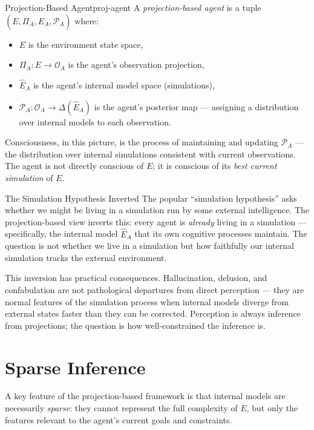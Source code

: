 \begin{definition}{Projection-Based Agent}{proj-agent}
  A \emph{projection-based agent} is a tuple $(E, \Pi_A, \hat{E}_A,
  \mathcal{P}_A)$ where:
  \begin{itemize}
    \item $E$ is the environment state space,
    \item $\Pi_A : E \to \mathcal{O}_A$ is the agent's observation
          projection,
    \item $\hat{E}_A$ is the agent's internal model space (simulations),
    \item $\mathcal{P}_A : \mathcal{O}_A \to \Delta(\hat{E}_A)$ is the
          agent's posterior map — assigning a distribution over internal
          models to each observation.
  \end{itemize}
\end{definition}

Consciousness, in this picture, is the process of maintaining and updating
$\mathcal{P}_A$ — the distribution over internal simulations consistent
with current observations. The agent is not directly conscious of $E$;
it is conscious of its \emph{best current simulation} of $E$.

\begin{conceptaside}{The Simulation Hypothesis Inverted}
  The popular ``simulation hypothesis'' asks whether we might be living
  in a simulation run by some external intelligence. The projection-based
  view inverts this: every agent is \emph{already} living in a simulation
  — specifically, the internal model $\hat{E}_A$ that its own cognitive
  processes maintain. The question is not whether we live in a simulation
  but how faithfully our internal simulation tracks the external environment.

  This inversion has practical consequences. Hallucination, delusion,
  and confabulation are not pathological departures from direct perception
  — they are normal features of the simulation process when internal
  models diverge from external states faster than they can be corrected.
  Perception is always inference from projections; the question is how
  well-constrained the inference is.
\end{conceptaside}

\section{Sparse Inference}

A key feature of the projection-based framework is that internal models
are necessarily \emph{sparse}: they cannot represent the full complexity
of $E$, but only the features relevant to the agent's current goals and
constraints.

